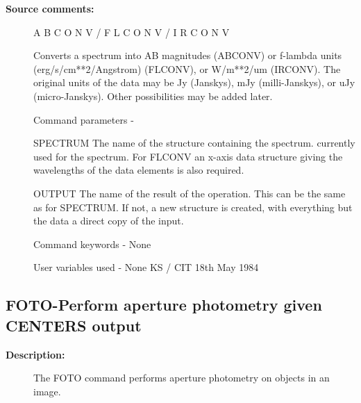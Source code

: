 \begin{description}
\begin{description}
\item [\textbf{Source comments:}]
\begin{terminalv}
 A B C O N V  /  F L C O N V  /  I R C O N V

 Converts a spectrum into AB magnitudes (ABCONV) or f-lambda
 units (erg/s/cm**2/Angstrom) (FLCONV), or W/m**2/um (IRCONV).
 The original units of the data may be Jy (Janskys), mJy
 (milli-Janskys), or uJy (micro-Janskys). Other possibilities
 may be added later.

 Command parameters -

 SPECTRUM The name of the structure containing the spectrum.
          currently used for the spectrum.  For FLCONV
          an x-axis data structure giving the wavelengths of the
          data elements is also required.

 OUTPUT   The name of the result of the operation.  This can
          be the same as for SPECTRUM. If not, a new structure
          is created, with everything but the data a direct
          copy of the input.

 Command keywords  - None

 User variables used - None
                                  KS / CIT 18th May 1984
\end{terminalv}
\end{description}
\subsection{FOTO-\label{FOTO}Perform aperture photometry given CENTERS output}
\begin{description}

\item [\textbf{Description:}]
 The FOTO command performs aperture photometry on objects
 in an image.


\end{description}
\end{description}
